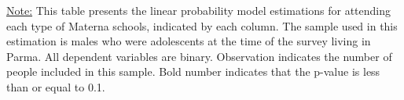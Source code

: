 \begin{footnotesize}
\noindent\underline{Note:} This table presents the linear probability model estimations for attending each type of Materna schools, indicated by each column. The sample used in this estimation is males who were adolescents at the time of the survey living in Parma. All dependent variables are binary. Observation indicates the number of people included in this sample. Bold number indicates that the p-value is less than or equal to 0.1.
\end{footnotesize}
